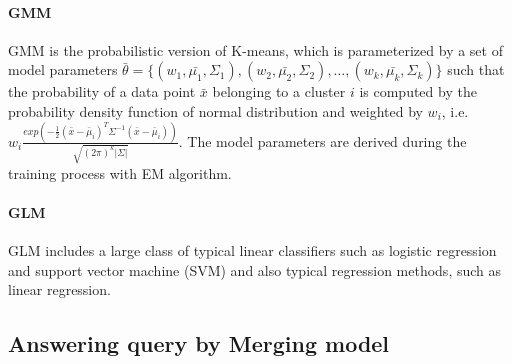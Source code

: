 \paragraph{GMM} GMM is the probabilistic version of K-means, which is parameterized by a set of model parameters $\bar{\theta} = \{(w_1, \bar{\mu_1}, \Sigma_1), (w_2, \bar{\mu_2}, \Sigma_2), \dots, (w_k, \bar{\mu_k}, \Sigma_k)\}$ such that the probability of a data point $\bar{x}$ belonging to a cluster $i$ is computed by the probability density function of normal distribution and weighted by $w_i$, i.e.  $w_i\frac{exp(-\frac{1}{2}(\bar{x}-\bar{\mu}_i)^T\Sigma^{-1}(\bar{x}-\bar{\mu}_i))}{\sqrt{(2\pi)^k|\Sigma|}}$. The model parameters are derived during the training process with EM algorithm.

\paragraph{GLM} GLM includes a large class of typical linear classifiers such as logistic regression and support vector machine (SVM) and also typical regression methods, such as linear regression.

\subsection{Answering query by Merging model}

